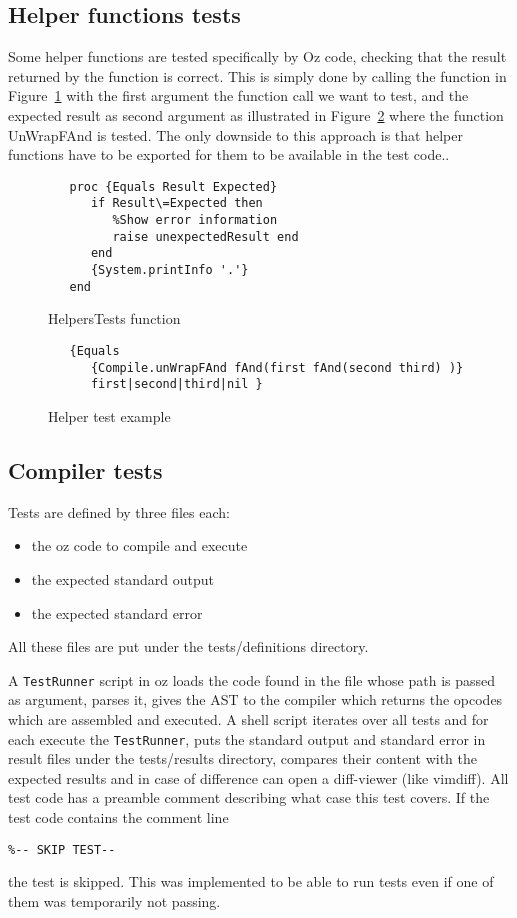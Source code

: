 \documentclass[a4paper]{memoir}
\begin{document}
\subsection{Helper functions tests}
Some helper functions are tested specifically by Oz code, checking that the result returned by the function is correct. This is simply done by calling the function in Figure~\ref{fig:helperstestsfunction} with the first argument the function call we want to test, and the expected result as second argument as illustrated in Figure~\ref{fig:helperstestsexample} where the function UnWrapFAnd is tested.
The only downside to this approach is that helper functions have to be exported for them to be available in the test code..

\begin{figure}
\begin{lstlisting}
   proc {Equals Result Expected}
      if Result\=Expected then
         %Show error information
         raise unexpectedResult end
      end
      {System.printInfo '.'}
   end
\end{lstlisting}
\label{fig:helperstestsfunction}
\caption{HelpersTests function}
\end{figure}

\begin{figure}
\begin{lstlisting}
   {Equals 
      {Compile.unWrapFAnd fAnd(first fAnd(second third) )}
      first|second|third|nil }
\end{lstlisting}
\label{fig:helperstestsexample}
\caption{Helper test example}
\end{figure}
\subsection{Compiler tests}
Tests are defined by three files each:
\begin{itemize}
  \item the oz code to compile and execute
  \item the expected standard output
  \item the expected standard error
\end{itemize}
All these files are put under the tests/definitions directory.

A \lstinline!TestRunner! script in oz loads the code found in the file whose path is passed as argument, parses it, gives the AST to the compiler which returns the opcodes which are assembled and executed. 
A shell script iterates over all tests and for each execute the
\lstinline!TestRunner!, puts the standard output and standard error in result
files under the tests/results directory, compares their content with the
expected results and in case of difference can open a diff-viewer (like vimdiff).
All test code has a preamble comment describing what case this test covers.
If the test code contains the comment line
\begin{lstlisting}
%-- SKIP TEST-- 
\end{lstlisting}
the test is skipped. This was implemented to be able to run tests even if one of them was temporarily not passing.
\end{document}
